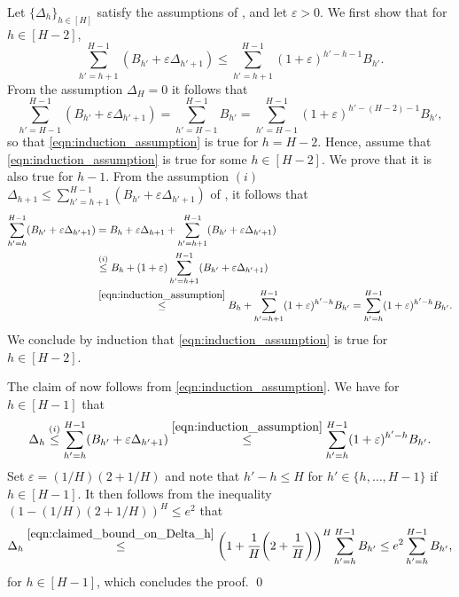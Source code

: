 \documentclass[11pt]{article}
\theoremstyle{definition}
\theoremstyle{definition}
\begin{document}
Let $\{\Delta_h\}_{h\in[H]}$ satisfy the assumptions of , and let $\varepsilon>0$.
We first show that for $h\in[H-2]$,
\begin{equation}
	\label{eqn:induction_assumption}
	\sum_{h'=h+1}^{H-1}
	(B_{h'}+\varepsilon \Delta_{h'+1})
	\leq
	\sum_{h'=h+1}^{H-1}
	(1+\varepsilon)^{h'-h-1}B_{h'}
	.
\end{equation}
From the assumption $\Delta_{H} = 0$ it follows that
\begin{equation}
	\sum_{h'=H-1}^{H-1}
	(B_{h'}+\varepsilon\Delta_{h'+1})= \sum_{h'=H-1}^{H-1}B_{h'}
	= \sum_{h'=H-1}^{H-1}(1+\varepsilon)^{h'-(H-2)-1}B_{h'},
\end{equation}
so that \eqref{eqn:induction_assumption} is true for $h = H-2$.
Hence, assume that \eqref{eqn:induction_assumption} is true for some $h\in[H-2]$.
We prove that it is also true for $h-1$.
From the assumption $(i)$ $\Delta_{h+1}\leq \sum_{h'=h+1}^{H-1}(B_{h'}+\varepsilon\Delta_{h'+1})$ of , it follows that
\begin{equation}
	\begin{split}
		\sum_{h'=h}^{H-1}
		(B_{h'}+\varepsilon \Delta_{h'+1})
		 &
		=
		B_h + \varepsilon \Delta_{h+1} + \sum_{h'=h+1}^{H-1}(B_{h'}+\varepsilon \Delta_{h'+1}) \\
		 &
		\overset{(i)}{\leq}
		B_h + (1+\varepsilon) \sum_{h'=h+1}^{H-1}(B_{h'}+\varepsilon\Delta_{h'+1})
		\\
		 &
		\overset{\eqref{eqn:induction_assumption}}{\leq}
		B_h + \sum_{h'=h+1}^{H-1}(1+\varepsilon)^{h'-h}B_{h'}
		=
		\sum_{h'=h}^{H-1}
		(1+\varepsilon)^{h'-h}B_{h'}
		.
	\end{split}
\end{equation}
We conclude by induction that \eqref{eqn:induction_assumption} is true for $h\in[H-2]$.

The claim of  now follows from \eqref{eqn:induction_assumption}.
We have for $h\in[H-1]$ that
\begin{equation}
	\label{eqn:claimed_bound_on_Delta_h}
	\Delta_h \overset{(i)}{\leq} \sum_{h'=h}^{H-1}(B_{h'}+\varepsilon \Delta_{h'+1}) \overset{\eqref{eqn:induction_assumption}}{\leq} \sum_{h'=h}^{H-1}(1+\varepsilon)^{h'-h}B_{h'}.
\end{equation}
Set $\varepsilon = (1/H)(2+1/H)$ and note that $h'-h\leq H$ for $h'\in\{h,\ldots,H-1\}$ if $h\in[H-1]$.
It then follows from the inequality $(1-(1/H)(2+1/H))^H\leq e^2$ that
\begin{equation}
	\Delta_h
	\overset{\eqref{eqn:claimed_bound_on_Delta_h}}{\leq}
	\biggl(1+\frac{1}{H}\biggl(2+\frac{1}{H}\biggr)\biggr)^{H}\sum_{h'=h}^{H-1}B_{h'}
	\leq
	e^2\sum_{h'=h}^{H-1}B_{h'},
\end{equation}
for $h\in[H-1]$, which concludes the proof.
\qed
\end{document}
